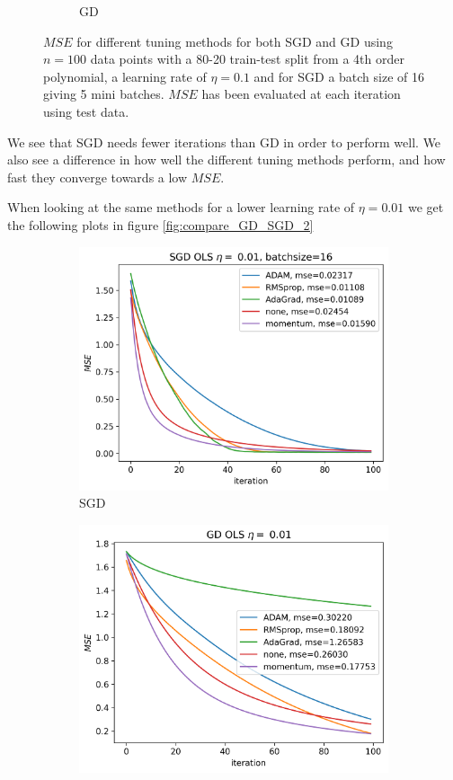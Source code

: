 \documentclass[11pt]{article}
\begin{document}
\begin{figure}[H]
\begin{subfigure}{.5\textwidth}
    \caption{GD}
    \label{fig:}
  \end{subfigure}
  \caption{$MSE$ for different tuning methods for both SGD and GD using $n=100$ data points with a 80-20 train-test split from a 4th order polynomial, a learning rate of $\eta=0.1$ and for SGD a batch size of 16 giving 5 mini batches. $MSE$ has been evaluated at each iteration using test data.}
  \label{fig:compare_GD_SGD}
\end{figure}
We see that SGD needs fewer iterations than GD in order to perform well. We also see a difference in how well the different tuning methods perform, and how fast they converge towards a low $MSE$.

When looking at the same methods for a lower learning rate of $\eta=0.01$ we get the following plots in figure \ref{fig:compare_GD_SGD_2}
\begin{figure}[H]
  \begin{subfigure}{.5\textwidth}
    \centering
    \includegraphics[width=\textwidth]{../figures/SGD_methods_OLS_eta_0.01.png}
    \caption{SGD}
    \label{fig:}
  \end{subfigure}
  \begin{subfigure}{.5\textwidth}
    \centering
    \includegraphics[width=\textwidth]{../figures/GD_methods_OLS_eta_0.01.png}

\end{subfigure}
\end{figure}
\end{document}
